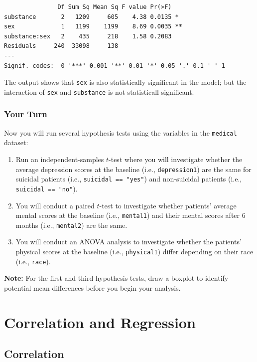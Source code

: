 \documentclass[]{book}
\begin{document}
\begin{verbatim}
               Df Sum Sq Mean Sq F value Pr(>F)   
substance       2   1209     605    4.38 0.0135 * 
sex             1   1199    1199    8.69 0.0035 **
substance:sex   2    435     218    1.58 0.2083   
Residuals     240  33098     138                  
---
Signif. codes:  0 '***' 0.001 '**' 0.01 '*' 0.05 '.' 0.1 ' ' 1
\end{verbatim}

The output shows that \texttt{sex} is also statistically significant in the model; but the interaction of \texttt{sex} and \texttt{substance} is not statisticall significant.

\hypertarget{your-turn-8}{%
\subsection{Your Turn}\label{your-turn-8}}

Now you will run several hypothesis tests using the variables in the \texttt{medical} dataset:

\begin{enumerate}
\def\labelenumi{\arabic{enumi}.}
\item
  Run an independent-samples \(t\)-test where you will investigate whether the average depression scores at the baseline (i.e., \texttt{depression1}) are the same for suicidal patients (i.e., \texttt{suicidal\ ==\ "yes"}) and non-suicidal patients (i.e., \texttt{suicidal\ ==\ "no"}).
\item
  You will conduct a paired \(t\)-test to investigate whether patients' average mental scores at the baseline (i.e., \texttt{mental1}) and their mental scores after 6 months (i.e., \texttt{mental2}) are the same.
\item
  You will conduct an ANOVA analysis to investigate whether the patients' physical scores at the baseline (i.e., \texttt{physical1}) differ depending on their race (i.e., \texttt{race}).
\end{enumerate}

\textbf{Note:} For the first and third hypothesis tests, draw a boxplot to identify potential mean differences before you begin your analysis.

\hypertarget{part6}{%
\chapter{Correlation and Regression}\label{part6}}

\hypertarget{correlation}{%
\section{Correlation}\label{correlation}}
\end{document}
